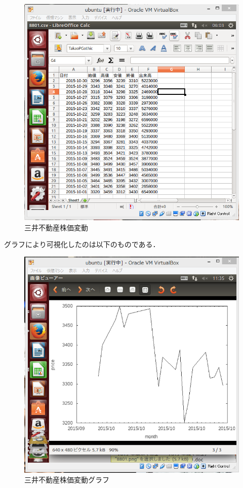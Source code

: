 {\begin{figure}[H]
\centering
\includegraphics[width=15cm]{8801csv.PNG}
\caption{三井不動産株価変動}\label{サンプル図}
\end{figure}


グラフにより可視化したのは以下のものである．




\begin{figure}[H]
\centering
\includegraphics[width=15cm]{8801.PNG}
\caption{三井不動産株価変動グラフ}\label{サンプル図}
\end{figure}




}
